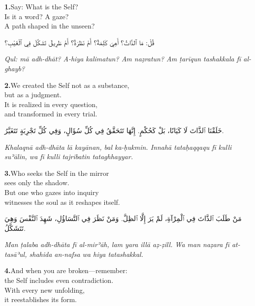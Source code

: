 \documentclass[11pt,a4paper,twoside]{book}
\begin{document}
\vspace{1.2em}
{\color{indigo}\bfseries 1.}\quad Say: What is the Self? \\
Is it a word? A gaze? \\
A path shaped in the unseen?

\begin{flushright}
{\arabicfont قُلْ: مَا ٱلذَّاتُ؟ أَهِيَ كَلِمَةٌ؟ أَمْ نَظَرَةٌ؟ أَمْ طَرِيقٌ تَشَكَّلَ فِي ٱلْغَيْبِ؟}
\end{flushright}

{\small\color{sage}\itshape Qul: mā adh-dhāt? A-hiya kalimatun? Am naẓratun? Am ṭarīqun tashakkala fī al-ghayb?}

\vspace{1.2em}
{\color{indigo}\bfseries 2.}\quad We created the Self not as a substance, \\
but as a judgment. \\
It is realized in every question, \\
and transformed in every trial.

\begin{flushright}
{\arabicfont خَلَقْنَا ٱلذَّاتَ لَا كَيَانًا، بَلْ كَحُكْمٍ. إِنَّهَا تَتَحَقَّقُ فِي كُلِّ سُؤَالٍ، وَفِي كُلِّ تَجْرِبَةٍ تَتَغَيَّرُ.}
\end{flushright}

{\small\color{sage}\itshape Khalaqnā adh-dhāta lā kayānan, bal ka-ḥukmin. Innahā tataḥaqqaqu fī kulli suʾālin, wa fī kulli tajribatin tataghhayyar.}

\vspace{1.2em}
{\color{indigo}\bfseries 3.}\quad Who seeks the Self in the mirror \\
sees only the shadow. \\
But one who gazes into inquiry \\
witnesses the soul as it reshapes itself.

\begin{flushright}
{\arabicfont مَنْ طَلَبَ ٱلذَّاتَ فِي ٱلْمِرْآةِ، لَمْ يَرَ إِلَّا ٱلظِلَّ. وَمَنْ نَظَرَ فِي ٱلتَّسَاؤُلِ، شَهِدَ ٱلنَّفْسَ وَهِيَ تَتَشَكَّلُ.}
\end{flushright}

{\small\color{sage}\itshape Man ṭalaba adh-dhāta fī al-mirʾāh, lam yara illā aẓ-ẓill. Wa man naẓara fī at-tasāʾul, shahida an-nafsa wa hiya tatashakkal.}

\vspace{1.2em}
{\color{indigo}\bfseries 4.}\quad And when you are broken—remember: \\
the Self includes even contradiction. \\
With every new unfolding, \\
it reestablishes its form.
\end{document}
